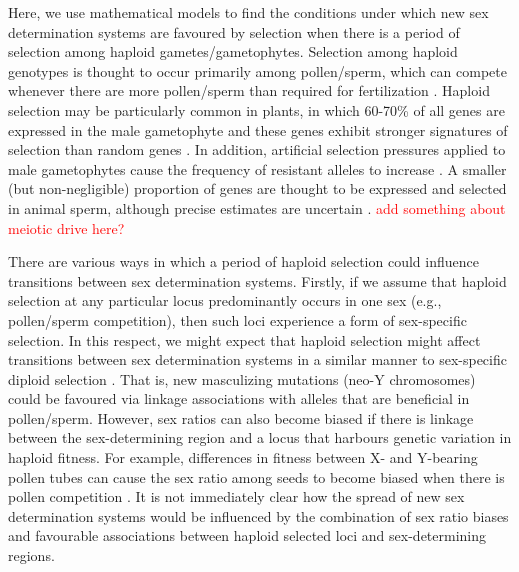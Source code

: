 \documentclass[12pt]{article}
\begin{document}

Here, we use mathematical models to find the conditions under which new sex determination systems are favoured by selection when there is a period of selection among haploid gametes/gametophytes. 
Selection among haploid genotypes is thought to occur primarily among pollen/sperm, which can compete whenever there are more pollen/sperm than required for fertilization \citep{Mulcahy:1996ha,JOSEPH:2004haa}. 
Haploid selection may be particularly common in plants, in which 60-70\% of all genes are expressed in the male gametophyte and these genes exhibit stronger signatures of selection than random genes \citep{Borg:2009jpa,Arunkumar:2013iq,Gossmann:2014dua}.
In addition, artificial selection pressures applied to male gametophytes cause the frequency of resistant alleles to increase \citep[e.g.,][]{Hormaza:1996cv,Ravikumar:2003uo,Hedhly:2004iv,Clarke:2004ir}. 
A smaller (but non-negligible) proportion of genes are thought to be expressed and selected in animal sperm, although precise estimates are uncertain \citep{Zheng:2001fi,JOSEPH:2004haa,Vibranovski:2010et}.
\textcolor{red}{add something about meiotic drive here?}  

There are various ways in which a period of haploid selection could influence transitions between sex determination systems. 
Firstly, if we assume that haploid selection at any particular locus predominantly occurs in one sex (e.g., pollen/sperm competition), then such loci experience a form of sex-specific selection. 
In this respect, we might expect that haploid selection might affect transitions between sex determination systems in a similar manner to sex-specific diploid selection \citep[as explored by][]{vanDoorn:2007eu,vanDoorn:2010hu}. 
That is, new masculizing mutations (neo-Y chromosomes) could be favoured via linkage associations with alleles that are beneficial in pollen/sperm. 
However, sex ratios can also become biased if there is linkage between the sex-determining region and a locus that harbours genetic variation in haploid fitness. 
For example, differences in fitness between X- and Y-bearing pollen tubes can cause the sex ratio among seeds to become biased when there is pollen competition \citep{Lloyd:1974tz,Conn:1981uw,Stehlik:2005ul,Stehlik:2006to,Field:2012fd,Field:2013cc}.
It is not immediately clear how the spread of new sex determination systems would be influenced by the combination of sex ratio biases and favourable associations between haploid selected loci and sex-determining regions. 
\end{document}
